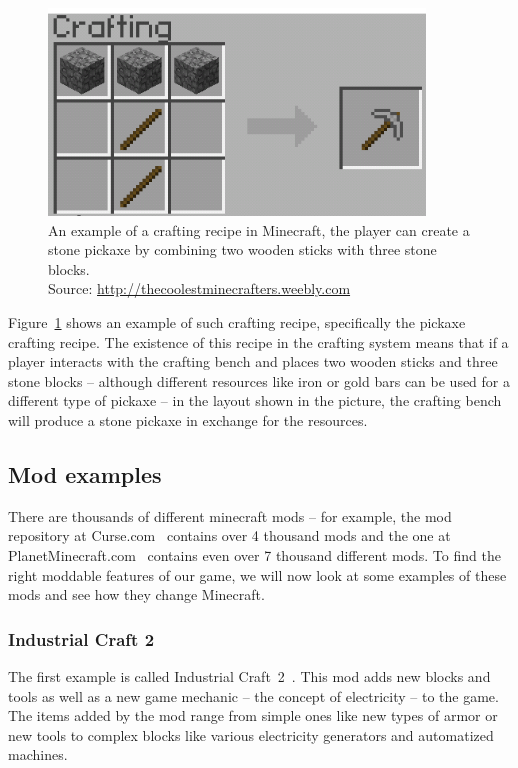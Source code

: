 \begin{figure}[H]
    \centering
    \includegraphics[width=10cm]{../img/MCCrafting.png}
    \caption{An example of a crafting recipe in Minecraft, the player can create a stone pickaxe by combining two wooden sticks
             with three stone blocks.
             \\Source: \href{http://thecoolestminecrafters.weebly.com/uploads/2/6/3/1/26317386/912472788.png}{http://thecoolestminecrafters.weebly.com}}
    \label{minecraft-crafting}
\end{figure}

Figure~\ref{minecraft-crafting} shows an example of such crafting recipe, specifically the pickaxe crafting
recipe. The existence of this recipe in the crafting system means that if a player interacts with the crafting bench and places
two wooden sticks and three stone blocks -- although different resources like iron or gold bars can be used for a different type
of pickaxe -- in the layout shown in the picture, the crafting bench will produce a stone pickaxe in exchange for the resources.

\subsection{Mod examples}

There are thousands of different minecraft mods -- for example, the mod repository at Curse.com~\cite{CurseMods} contains
over 4 thousand mods and the one at PlanetMinecraft.com~\cite{PlanetMinecraftMods} contains even over 7 thousand different mods.
To find the right moddable features of our game, we will now look at some examples of these mods and see how they change Minecraft.

\subsubsection{Industrial Craft 2}

The first example is called Industrial Craft~2~\cite{IndustrialCraft}. This mod adds new blocks and tools as well as a new game mechanic
-- the concept of electricity -- to the game. The items added by the mod range from simple ones like new types of armor or
new tools to complex blocks like various electricity generators and automatized machines.

